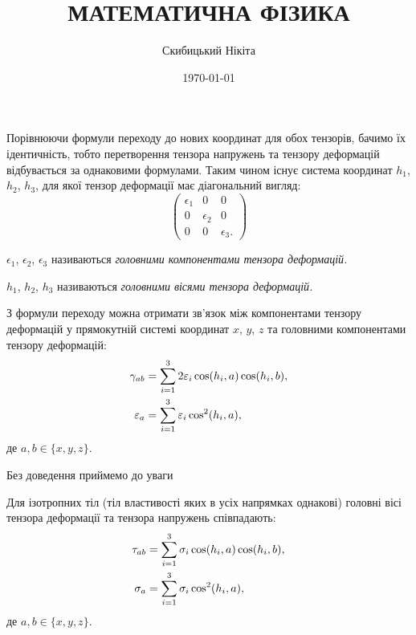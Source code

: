 

\title{{\Huge МАТЕМАТИЧНА ФІЗИКА}}
\author{Скибицький Нікіта}
\date{\today}





\tableofcontents

\setcounter{section}{3}
\setcounter{subsection}{2}
\setcounter{subsubsection}{5}
\setcounter{theorem}{22}
\setcounter{equation}{56}

Порівнюючи формули переходу до нових координат для обох тензорів, бачимо їх ідентичність, тобто перетворення тензора напружень та тензору деформацій відбувається за однаковими формулами. Таким чином існує система координат $h_1$, $h_2$, $h_3$, для якої тензор деформації має діагональний вигляд: 
\begin{equation}
	\begin{pmatrix}
		\epsilon_1 & 0 & 0 \\
		0 & \epsilon_2 & 0 \\
		0 & 0 & \epsilon_3.
	\end{pmatrix}
\end{equation}

\begin{definition}
 	$\epsilon_1$, $\epsilon_2$, $\epsilon_3$ називаються \it{головними компонентами} тензора деформацій.
\end{definition} 

\begin{definition}
	$h_1$, $h_2$, $h_3$ називаються \it{головними вісями} тензора деформацій.
\end{definition}

З формули переходу можна отримати зв'язок між компонентами тензору деформацій у прямокутній системі координат $x$, $y$, $z$ та головними компонентами тензору деформацій:
\begin{align}
	\gamma_{a b} &= \displaystyle\sum\limits_{i = 1}^3 2 \varepsilon_i \cos (h_i, a) \cos (h_i, b), \\
	\varepsilon_a &= \displaystyle\sum\limits_{i = 1}^3 \varepsilon_i \cos^2(h_i, a),
\end{align}
де $a, b \in \{x, y, z\}$. \medskip

Без доведення приймемо до уваги 

\begin{proposition}
	Для ізотропних тіл (тіл властивості яких в усіх напрямках однакові) головні вісі тензора деформації та тензора напружень співпадають:
	\begin{align}
		\tau_{a b} &= \displaystyle\sum\limits_{i = 1}^3  \sigma_i \cos (h_i, a) \cos (h_i, b), \\
		\sigma_a &= \displaystyle\sum\limits_{i = 1}^3 \sigma_i \cos^2(h_i, a),
	\end{align}
	де $a, b \in \{x, y, z\}$.
\end{proposition}

